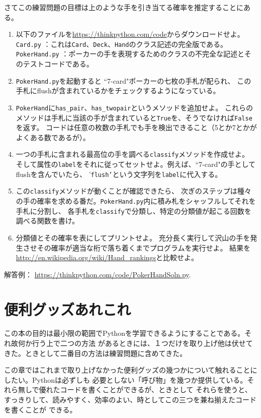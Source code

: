 \documentclass[a4j,12pt,makeidx]{jbook}
\begin{document}
さてこの練習問題の目標は上のような手を引き当てる確率を推定することにある。
\begin{enumerate}
\item 以下のファイルを\url{https://thinkpython.com/code}からダウンロードせよ。
{\tt Card.py} ：これは{\tt Card}、{\tt Deck}、{\tt Hand}のクラス記述の完全版である。\\
{\tt PokerHand.py} ：ポーカーの手を表現するためのクラスの不完全な記述とそのテストコードである。
\item {\tt PokerHand.py}を起動すると ``7-card"ポーカーの七枚の手札が配られ、
この手札にflushが含まれているかをチェックするようになっている。
\item {\tt PokerHand}に{\tt has\_pair}、{\tt has\_twopair}というメソッドを追加せよ。
これらのメソッドは手札に当該の手が含まれていると{\tt True}を、そうでなければ{\tt False}を返す。
コードは任意の枚数の手札でも手を検出できること（5とか7とかがよくある数であるが）。
\item 一つの手札に含まれる最高位の手を調べる{\tt classify}メソッドを作成せよ。
そして属性の{\tt label}をそれに従ってセットせよ。例えば、``7-card"の手としてflushを含んでいたら、
'{\tt flush'}という文字列を{\tt label}に代入する。
\item この{\tt classify}メソッドが動くことが確認できたら、
次ぎのステップは種々の手の確率を求める番だ。{\tt PokerHand.py}内に積み札をシャッフルしてそれを手札に分割し、
各手札を{\tt classify}で分類し、特定の分類値が起こる回数を調べる関数を書け。
\item 分類値とその確率を表にしてプリントせよ。
充分長く実行して沢山の手を発生させその確率が適当な桁で落ち着くまでプログラムを実行せよ。
結果を\url{http://en.wikipedia.org/wiki/Hand_rankings}と比較せよ。
\end{enumerate}
解答例： \url{https://thinkpython.com/code/PokerHandSoln.py}.
%
\chapter{便利グッズあれこれ}
この本の目的は最小限の範囲でPythonを学習できるようにすることである。それ故何か行う上で二つの方法
があるときには、１つだけを取り上げ他は伏せてきた。ときとして二番目の方法は練習問題に含めてきた。\par
この章ではこれまで取り上げなかった便利グッズの幾つかについて触れることにしたい。Pythonは必ずしも
必要としない「呼び物」を幾つか提供している。それら無しで優れたコードを書くことができるが、ときとして
それらを使うと、すっきりして、読みやすく、効率のよい、時としてこの三つを兼ね揃えたコードを書くことが
できる。
%
\end{document}
